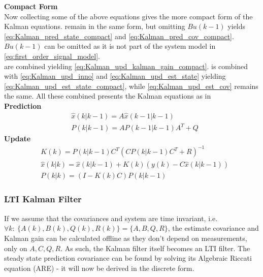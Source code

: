 \textbf{Compact Form}\\
Now collecting some of the above equations gives the more compact form of the Kalman equations.
 remain in the same form, but omitting $ {Bu}(k-1) $ yields \cref{eq:Kalman_pred_state_compact} and \cref{eq:Kalman_pred_cov_compact}. $ {Bu}(k-1) $ can be omitted as it is not part of the system model in \cref{eq:first_order_signal_model}.\\
 are combined yielding \cref{eq:Kalman_upd_kalman_gain_compact}.  is combined with \cref{eq:Kalman_upd_inno} and \cref{eq:Kalman_upd_est_state} yielding \cref{eq:Kalman_upd_est_state_compact}, while \cref{eq:Kalman_upd_est_cov} remains the same. All these combined presents the Kalman equations as in \cite{Bozic1994}\\

\textbf{Prediction}
\begin{align}
	&\hat{{x}}	(k|k-1) = {A} \hat{{x}}	(k-1|k-1) 		\label{eq:Kalman_pred_state_compact} 	\\
	&{P}			(k|k-1) = {A}{P}			(k-1|k-1){A}^T+{Q} 				\label{eq:Kalman_pred_cov_compact} 		
\end{align}
\textbf{Update}
\begin{align}
	&{K}			(k) 		= {P}				(k|k-1){C}^T({C}{P}	(k|k-1)	{C}^T + {R})^{-1}										\label{eq:Kalman_upd_kalman_gain_compact} \\
	&\hat{{x}}	(k|k) 	= \hat{{x}}			(k|k-1) + {K}						(k)	({y}		(k) - {C}\hat{{x}}		(k|k-1)) 	\label{eq:Kalman_upd_est_state_compact} \\
	&{P}			(k|k) 	= ({I} - {K}	(k){C}){P}					(k|k-1)																		\label{eq:Kalman_upd_est_cov_compact}
\end{align}


\subsubsection{LTI Kalman Filter}
If we assume that the covariances and system are time invariant, i.e. $\forall k: \ \{A(k),B(k),Q(k),R(k)\} = \{A,B,Q,R\} $, the estimate covariance and Kalman gain can be calculated offline as they don't depend on measurements, only on $ {A}, {C}, {Q}, {R} $. As such, the Kalman filter itself becomes an LTI filter. The steady state prediction covariance can be found by solving its Algebraic Riccati equation (ARE) - it will now be derived in the discrete form.\\


